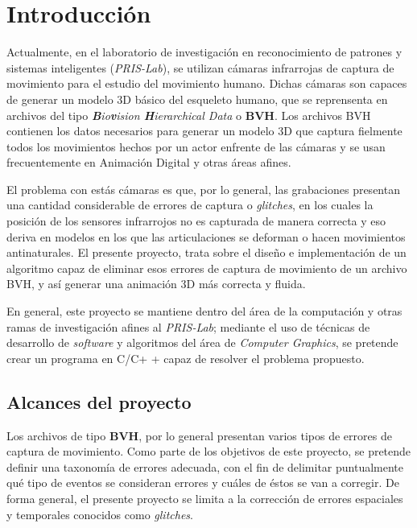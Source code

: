   \chapter{Introducción}
\label{C:introduccion}

Actualmente, en el laboratorio de investigación en  reconocimiento de patrones y sistemas inteligentes (\textit{PRIS-Lab}), se utilizan cámaras infrarrojas de captura de movimiento para el estudio del movimiento humano. Dichas cámaras son capaces de generar un modelo 3D básico del esqueleto humano, que se reprensenta en archivos del tipo  \textit{\textbf{B}io\textbf{v}ision \textbf{H}ierarchical Data} o \textbf{BVH}.  Los archivos BVH contienen los datos necesarios para generar un modelo 3D que captura fielmente todos los movimientos hechos por un actor enfrente de las cámaras y se usan frecuentemente en Animación Digital y otras áreas afines.

El problema con estás cámaras es que, por lo general, las grabaciones presentan una cantidad considerable de errores de captura o \textit{glitches}, en los cuales la posición de los sensores infrarrojos no es capturada de manera correcta y eso deriva en modelos en los que las articulaciones se deforman o hacen movimientos antinaturales.  El presente proyecto, trata sobre el diseño e implementación de un algoritmo capaz de eliminar esos errores de captura de movimiento de un archivo BVH, y así generar una animación 3D más correcta y fluida.  

En general, este proyecto se mantiene dentro del área de la computación y otras ramas de investigación afines al \textit{PRIS-Lab}; mediante el uso de técnicas de desarrollo de \textit{software} y algoritmos del área de \textit{Computer Graphics}, se pretende crear un programa en C/C+ + capaz de resolver el problema propuesto. 



\section{Alcances del proyecto}

Los archivos de tipo \textbf{BVH}, por lo general presentan varios tipos de errores de captura de movimiento.  Como parte de los objetivos de este proyecto, se pretende definir una taxonomía de errores adecuada, con el fin de delimitar puntualmente qué tipo de eventos se consideran errores y cuáles de éstos se van a corregir. De forma general, el presente proyecto se limita a la corrección de errores espaciales y temporales conocidos como \textit{glitches}.

